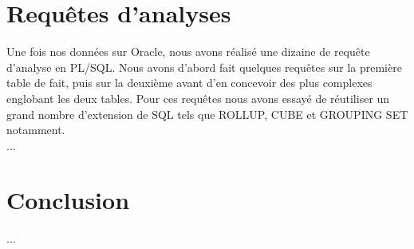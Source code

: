 \documentclass[a4paper,sffamily,12pt]{article}
\begin{document}
	\section{Requêtes d'analyses}

		\vspace{0.5cm}
		
		Une fois nos données sur Oracle, nous avons réalisé une dizaine de requête d'analyse en PL/SQL. Nous avons d'abord fait quelques requêtes sur la première table de fait, puis sur la deuxième avant d'en concevoir des plus complexes englobant les deux tables. Pour ces requêtes nous avons essayé de réutiliser un grand nombre d'extension de SQL tels que ROLLUP, CUBE et GROUPING SET notamment. \\		
		
		... \\
		
		\vspace{0.5cm}
																
	\section{Conclusion}

		\vspace{0.5cm}
		
		... \\
						
\end{document}
